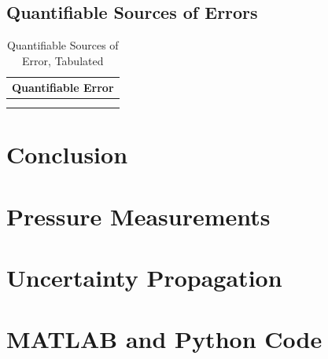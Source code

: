 \documentclass[runningheads]{llncs}
\begin{document}
\subsection{Quantifiable Sources of Errors}
\begin{table}[H]
\begin{center}
    \begin{tabular}{ll}
        \toprule
        \multicolumn{2}{c}{Quantifiable Error}\\
        \midrule
         & \\
         & \\
        \bottomrule
\end{tabular}
\end{center}
\caption{Quantifiable Sources of Error, Tabulated}
\label{tab:quant_error}
\end{table}




\section{Conclusion}










\appendix

\section{Pressure Measurements}

\section{Uncertainty Propagation}

\section{MATLAB and Python Code}
\end{document}
